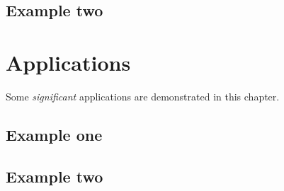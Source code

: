 \documentclass[]{book}
\theoremstyle{definition}
\theoremstyle{definition}
\theoremstyle{remark}
\begin{document}
\section{Example two}\label{example-two}

\chapter{Applications}\label{applications-1}

Some \emph{significant} applications are demonstrated in this chapter.

\section{Example one}\label{example-one-1}

\section{Example two}\label{example-two-1}
\end{document}
